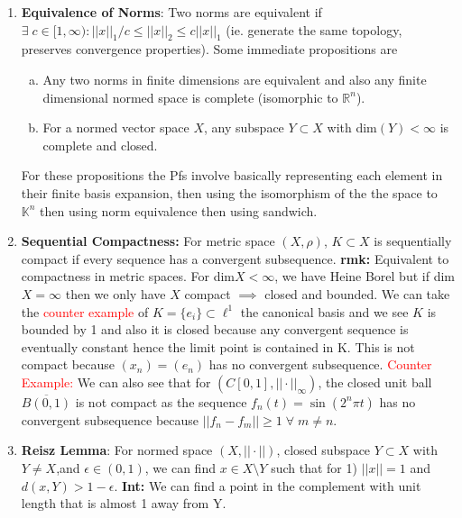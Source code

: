 \documentclass{article}
\begin{document}
\begin{enumerate}
    \item \textbf{Equivalence of Norms}: Two norms are equivalent if \(\exists \; c \in [1, \infty):||x||_1/c \leq ||x||_2 \leq c||x||_1\) (ie. generate the same topology, preserves convergence properties). Some immediate propositions are
    \begin{enumerate} [a.]
        \item Any two norms in finite dimensions are equivalent and also any finite dimensional normed space is complete (isomorphic to \(\mathbb{R}^n\)).
        \item For a normed vector space \(X\), any subspace \(Y \subset X\) with dim\((Y) < \infty\) is complete and closed.
    \end{enumerate}

    For these propositions the Pfs involve basically representing each element in their finite basis expansion, then using the isomorphism of the the space to \(\mathbb{K}^n\) then using norm equivalence then using sandwich.
    
    \item \textbf{Sequential Compactness:} For metric space \((X, \rho)\), \(K \subset X\) is sequentially compact if every sequence has a convergent subsequence. \textbf{rmk:} Equivalent to compactness in metric spaces. For dim\(X < \infty\), we have Heine Borel but if dim\(X = \infty\) then we only have \(X\) compact \(\implies \) closed and bounded. We can take the \textcolor{red}{counter example} of \(K = \{e_i\} \subset \ell^1\) the canonical basis and we see \(K\) is bounded by 1 and also it is closed because any convergent sequence is eventually constant hence the limit point is contained in K. This is not compact because \((x_n) = (e_n)\) has no convergent subsequence. \textcolor{red}{Counter Example:} We can also see that for \((C[0,1], ||\cdot||_\infty)\), the closed unit ball \(\overline{B(0,1)}\) is not compact as the sequence \(f_n(t) = \sin(2^n \pi t)\) has no convergent subsequence because \(||f_n - f_m|| \geq 1 \; \forall \; m\neq n\).\\

    \item \textbf{Reisz Lemma}: For normed space \((X, ||\cdot||)\), closed subspace \(Y \subset X\) with \(Y \neq X\),and \(\epsilon\in(0,1)\), we can find \(x \in X \setminus Y\) such that for 1) \(||x|| = 1\) and \(d(x, Y) > 1-\epsilon\). \textbf{Int:} We can find a point in the complement with unit length that is almost 1 away from Y.


\end{enumerate}
\end{document}
